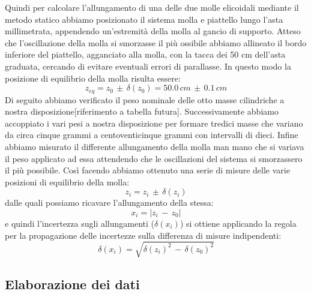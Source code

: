 \documentclass[11pt, twoside, a4paper]{article}
\begin{document}
Quindi per calcolare l'allungamento di una delle due molle elicoidali mediante il metodo statico abbiamo posizionato il sistema molla e piattello lungo l'asta millimetrata, appendendo un'estremità della molla al gancio di supporto. Atteso che l'oscillazione della molla si smorzasse il più ossibile abbiamo allineato il bordo inferiore del piattello, agganciato alla molla, con la tacca dei 50 cm dell'asta graduata, cercando di evitare eventuali errori di parallasse. In questo modo la posizione di equilibrio della molla risulta essere:
\begin{equation}
	z_{eq} = z_0\,\pm\,\delta(z_0) = 50.0\,cm\,\pm\,0.1\,cm
\end{equation}
Di seguito abbiamo verificato il peso nominale delle otto masse cilindriche a nostra disposizione[riferimento a tabella futura]. Successivamente abbiamo accoppiato i vari pesi a nostra disposizione per formare tredici masse che variano da circa cinque grammi a centoventicinque grammi con intervalli di dieci. Infine abbiamo misurato il differente allungamento della molla man mano che  si variava il peso applicato ad essa attendendo che le oscillazioni del sistema si smorzassero il più possibile. Così facendo abbiamo ottenuto una serie di misure delle varie posizioni di equilibrio della molla:
\begin{equation}
	z_i = z_i\,\pm\,\delta(z_i) 
\end{equation}
dalle quali possiamo ricavare l'allungamento della stessa:
\begin{equation}
	x_i = |z_i\,-\,z_0|
\end{equation}
e quindi l’incertezza sugli allungamenti ($\delta(x_i)$) si ottiene applicando la regola per la propagazione delle incertezze sulla differenza di misure indipendenti:
\begin{equation}
	\delta(x_i) = \sqrt{\delta(z_i)^2\,-\,\delta(z_0)^2}
\end{equation}

\subsection{Elaborazione dei dati}
\end{document}
